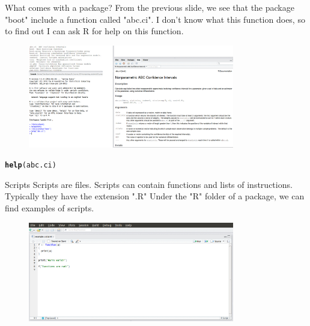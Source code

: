 \documentclass{beamer}\usepackage[]{graphicx}\usepackage[]{color}
\makeatletter
\newcommand{\hlstd}[1]{\textcolor[rgb]{0.345,0.345,0.345}{#1}}%
\newcommand{\hlkwd}[1]{\textcolor[rgb]{0.737,0.353,0.396}{\textbf{#1}}}%
\newenvironment{kframe}{%
 \def\at@end@of@kframe{}%
 \ifinner\ifhmode%
  \def\at@end@of@kframe{\end{minipage}}%
  \begin{minipage}{\columnwidth}%
 \fi\fi%
 \def\FrameCommand##1{\hskip\@totalleftmargin \hskip-\fboxsep
 \colorbox{shadecolor}{##1}\hskip-\fboxsep
     \hskip-\linewidth \hskip-\@totalleftmargin \hskip\columnwidth}%
 \MakeFramed {\advance\hsize-\width
   \@totalleftmargin\z@ \linewidth\hsize
   \@setminipage}}%
 {\par\unskip\endMakeFramed%
 \at@end@of@kframe}
\newenvironment{knitrout}{}{} %
\makeatother
\begin{document}
\begin{frame}[fragile]{What comes with a package?}
From the previous slide, we see that the package "boot" include a function called "abc.ci". I don't know what this function does, so to find out I can ask R for help on this function.
\begin{figure}[ht!]
\centering
\includegraphics[width=90mm]{pictures/help_abc_ci.jpg}
\label{overflow}
\end{figure}
\begin{knitrout}
\color{fgcolor}\begin{kframe}
\begin{alltt}
\hlkwd{help}\hlstd{(abc.ci)}
\end{alltt}
\end{kframe}
\end{knitrout}


\end{frame}



\begin{frame}[fragile]{Scripts}
Scripts are files.
\linebreak
Scripts can contain functions and lists of instructions. Typically they have the extension ".R"
\linebreak 
Under the "R" folder of a package, we can find examples of scripts.
\begin{figure}[ht!]
\centering
\includegraphics[width=90mm]{pictures/example_script.jpg}
\label{overflow}
\end{figure}
\end{frame}
\end{document}
